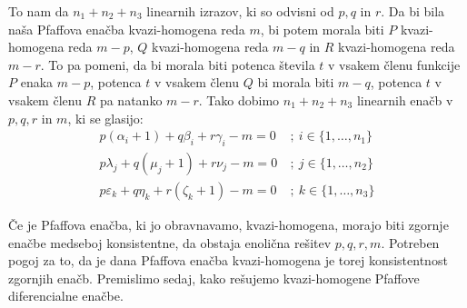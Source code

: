 \documentclass[a4paper, 10pt]{article}
\begin{document}
						To nam da $n_1 + n_2 + n_3$ linearnih izrazov, ki so odvisni od $p, q$ in $r$. Da bi bila naša Pfaffova enačba kvazi-homogena reda $m$, bi potem morala biti $P$ kvazi-homogena reda $m-p$, $Q$ kvazi-homogena reda $m-q$ in $R$ kvazi-homogena reda $m-r$. To pa pomeni, da bi morala biti potenca števila $t$ v vsakem členu funkcije $P$ enaka $m-p$, potenca $t$ v vsakem členu $Q$ bi morala biti $m-q$, potenca $t$ v vsakem členu $R$ pa natanko $m-r$. Tako dobimo $n_1 + n_2 + n_3$ linearnih enačb v $p, q, r$ in $m$, ki se glasijo: \begin{align*}
							p(\alpha_i+1) + q\beta_i + r\gamma_i - m = 0~&;~ i\in \{1, \ldots, n_1\} \\
							p\lambda_j + q(\mu_j+1) + r\nu_j - m= 0~&;~ j\in \{1, \ldots, n_2\} \\
							p\varepsilon_k + q\eta_k + r(\zeta_k+1) - m=0~&;~ k\in \{1, \ldots, n_3\}
						\end{align*}
						
						Če je Pfaffova enačba, ki jo obravnavamo, kvazi-homogena, morajo biti zgornje enačbe medseboj konsistentne, da obstaja enolična rešitev $p, q, r, m$. Potreben pogoj za to, da je dana Pfaffova enačba kvazi-homogena je torej konsistentnost zgornjih enačb. Premislimo sedaj, kako rešujemo kvazi-homogene Pfaffove diferencialne enačbe.
						
\end{document}
